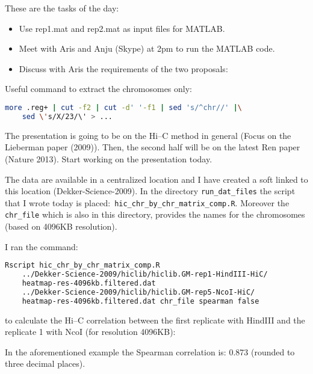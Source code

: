 \documentclass[idxtotoc,hyperref,openany]{labbook} %
\begin{document}
These are the tasks of the day:

\begin{itemize}
\item Use rep1.mat and rep2.mat as input files for MATLAB.
\item Meet with Aris and Anju (Skype) at 2pm to run the MATLAB code. 
\item Discuss with Aris the requirements of the two proposals:
\end{itemize}

Useful command to extract the chromosomes only: 

\begin{lstlisting}[language=bash]
	more .reg+ | cut -f2 | cut -d' '-f1 | sed 's/^chr//' |\
	sed \'s/X/23/\' > ...
\end{lstlisting}

The presentation is going to be on the Hi--C method in general (Focus on
the Lieberman paper (2009)). Then, the second half will be on the latest 
Ren paper (Nature 2013). Start working on the presentation today.

The data are available in a centralized location and I have created a soft
linked to this location (Dekker-Science-2009). In the directory \texttt{run\_dat\_files} the script that I wrote today is placed:~\texttt{hic\_chr\_by\_chr\_matrix\_comp.R}. Moreover the \texttt{chr\_file} which is also in this directory, provides the names
for the chromosomes (based on 4096KB resolution).

I ran the command:

\begin{lstlisting}[language=bash]
	Rscript hic_chr_by_chr_matrix_comp.R 
	../Dekker-Science-2009/hiclib/hiclib.GM-rep1-HindIII-HiC/
	heatmap-res-4096kb.filtered.dat
	../Dekker-Science-2009/hiclib/hiclib.GM-rep5-NcoI-HiC/
	heatmap-res-4096kb.filtered.dat chr_file spearman false
\end{lstlisting}

to calculate the Hi--C correlation between the first replicate
with HindIII and the replicate 1 with NcoI (for resolution 4096KB):

In the aforementioned example the Spearman correlation is: 0.873 (rounded
to three decimal places). 
\end{document}
